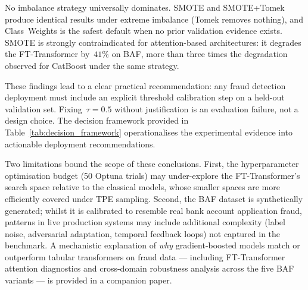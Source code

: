 \documentclass[a4paper,fleqn]{cas-sc}
\begin{document}
No imbalance strategy universally dominates.
SMOTE and SMOTE+Tomek produce identical results under extreme imbalance (Tomek removes
nothing), and Class~Weights is the safest default when no prior validation evidence exists.
SMOTE is strongly contraindicated for attention-based architectures: it degrades the
FT-Transformer by~$41\%$ on BAF, more than three times the degradation observed for
CatBoost under the same strategy.

These findings lead to a clear practical recommendation: any fraud detection deployment
must include an explicit threshold calibration step on a held-out validation set.
Fixing~$\tau=0.5$ without justification is an evaluation failure, not a design choice.
The decision framework provided in Table~\ref{tab:decision_framework} operationalises
the experimental evidence into actionable deployment recommendations.

Two limitations bound the scope of these conclusions.
First, the hyperparameter optimisation budget (50 Optuna trials) may under-explore the
FT-Transformer's search space relative to the classical models, whose smaller spaces are
more efficiently covered under TPE sampling.
Second, the BAF dataset is synthetically generated; whilst it is calibrated to resemble
real bank account application fraud, patterns in live production systems may include
additional complexity (label noise, adversarial adaptation, temporal feedback loops)
not captured in the benchmark.
A mechanistic explanation of \emph{why} gradient-boosted models match or outperform
tabular transformers on fraud data --- including FT-Transformer attention diagnostics and
cross-domain robustness analysis across the five BAF variants --- is provided in a
companion paper.

\printcredits



\end{document}
